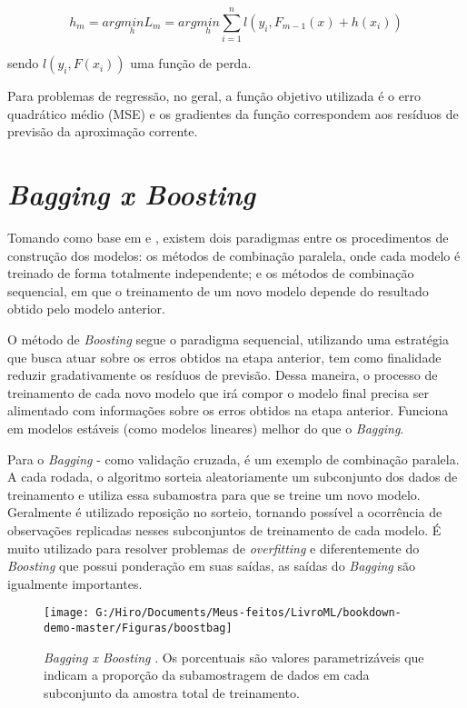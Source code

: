 \documentclass[
  openany]{book}
\begin{document}
\begin{equation}
   h_m=arg \underset{h}{min} L_m = arg \underset{h}{min} \displaystyle \sum^n_{i=1}l(y_i,F_{m-1}(x)+h(x_i))
    \label{eq:gdboosttree}
\end{equation}

sendo \(l(y_i,F(x_i))\) uma função de perda.

Para problemas de regressão, no geral, a função objetivo utilizada é o erro quadrático médio (MSE) e os gradientes da função correspondem aos resíduos de previsão da aproximação corrente.

\hypertarget{bagboost}{%
\section{\texorpdfstring{\emph{Bagging x Boosting}}{Bagging x Boosting}}\label{bagboost}}

Tomando como base em \citet{zhou2012ensemble} e \citet{mayrink2015avaliaccao}, existem dois paradigmas entre os procedimentos de construção dos modelos: os métodos de combinação paralela, onde cada modelo é treinado de forma totalmente independente; e os métodos de combinação sequencial, em que o treinamento de um novo modelo depende do resultado obtido pelo modelo anterior.

O método de \emph{Boosting} segue o paradigma sequencial, utilizando uma estratégia que busca atuar sobre os erros obtidos na etapa anterior, tem como finalidade reduzir gradativamente os resíduos de previsão. Dessa maneira, o processo de treinamento de cada novo modelo que irá compor o modelo final precisa ser alimentado com informações sobre os erros obtidos na etapa anterior. Funciona em modelos estáveis (como modelos lineares) melhor do que o \emph{Bagging}.

Para o \emph{Bagging} - como validação cruzada, é um exemplo de combinação paralela. A cada rodada, o algoritmo sorteia aleatoriamente um subconjunto dos dados de treinamento e utiliza essa subamostra para que se treine um novo modelo. Geralmente é utilizado reposição no sorteio, tornando possível a ocorrência de observações replicadas nesses subconjuntos de treinamento de cada modelo. É muito utilizado para resolver problemas de \emph{overfitting} e diferentemente do \emph{Boosting} que possui ponderação em suas saídas, as saídas do \emph{Bagging} são igualmente importantes.

\begin{figure}

{\centering \texttt{[image: G:/Hiro/Documents/Meus-feitos/LivroML/bookdown-demo-master/Figuras/boostbag]} 

}

\caption{\emph{Bagging x Boosting} \citep{mayrink2015avaliaccao}. Os porcentuais são valores parametrizáveis que indicam a proporção da subamostragem de dados em cada subconjunto da amostra total de treinamento.}\label{fig:boostbag}
\end{figure}
\end{document}
